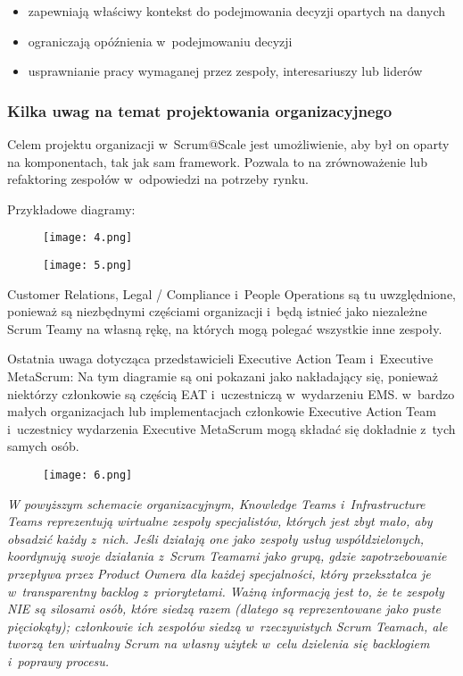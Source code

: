 \documentclass[12pt,a4paper,parskip=full]{scrartcl}
\begin{document}
\begin{itemize}
\itemsep1pt\parskip0pt
\item
  zapewniają właściwy kontekst do podejmowania decyzji opartych na danych
\item
  ograniczają opóźnienia w~podejmowaniu decyzji
\item
  usprawnianie pracy wymaganej przez zespoły, interesariuszy lub liderów
\end{itemize}

\subsubsection{Kilka uwag na temat projektowania organizacyjnego}\label{some-notes-on-organizational-design}

Celem projektu organizacji w~Scrum@Scale jest umożliwienie, aby był on oparty na komponentach, tak jak sam framework. Pozwala to na zrównoważenie lub refaktoring zespołów w~odpowiedzi na potrzeby rynku.

Przykładowe diagramy:
\begin{figure}[H]
    \centering
    \texttt{[image: 4.png]}
\end{figure}
\begin{figure}[H]
    \centering
    \texttt{[image: 5.png]}
\end{figure}

Customer Relations, Legal / Compliance i~People Operations są tu uwzględnione, ponieważ są niezbędnymi częściami organizacji i~będą istnieć jako niezależne Scrum Teamy na własną rękę, na których mogą polegać wszystkie inne zespoły.

Ostatnia uwaga dotycząca przedstawicieli Executive Action Team i~Executive MetaScrum: Na tym diagramie są oni pokazani jako nakładający się, ponieważ niektórzy członkowie są częścią EAT i~uczestniczą w~wydarzeniu EMS. w~bardzo małych organizacjach lub implementacjach członkowie Executive Action Team i~uczestnicy wydarzenia Executive MetaScrum mogą składać się dokładnie z~tych samych osób.

\begin{figure}[H]
    \centering
    \texttt{[image: 6.png]}
\end{figure}

\emph{W powyższym schemacie organizacyjnym, Knowledge Teams i~Infrastructure Teams reprezentują wirtualne zespoły specjalistów, których jest zbyt mało, aby obsadzić każdy z~nich. Jeśli działają one jako zespoły usług współdzielonych, koordynują swoje działania z~Scrum Teamami jako grupą, gdzie zapotrzebowanie przepływa przez Product Ownera dla każdej specjalności, który przekształca je w~transparentny backlog z~priorytetami. Ważną informacją jest to, że te zespoły NIE są silosami osób, które siedzą razem (dlatego są reprezentowane jako puste pięciokąty); członkowie ich zespołów siedzą w~rzeczywistych Scrum Teamach, ale tworzą ten wirtualny Scrum na własny użytek w~celu dzielenia się backlogiem i~poprawy procesu.}
\end{document}
